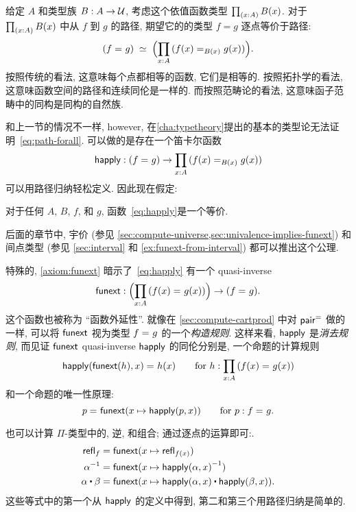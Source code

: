 %
%
%
给定 $A$ 和类型族 $B : A \to \mathcal{U}$, 考虑这个依值函数类型 $\prd{x:A}B(x)$.
对于 $\prd{x:A} B(x)$ 中从 $f$ 到 $g$ 的路径, 期望它的的类型 $f=g$ 逐点等价于路径:
\begin{equation}
  \eqvspaced{(\id{f}{g})}{\Parens{\prd{x:A} (\id[B(x)]{f(x)}{g(x)})}}.\label{eq:path-forall}
\end{equation}
按照传统的看法, 这意味每个点都相等的函数, 它们是相等的.
%
按照拓扑学的看法, 这意味函数空间的路径和连续同伦是一样的.
%
而按照范畴论的看法, 这意味函子范畴中的同构是同构的自然族.

和上一节的情况不一样, however, 在\cref{cha:typetheory}提出的基本的类型论无法证明~\eqref{eq:path-forall}.
可以做的是存在一个笛卡尔函数
\begin{equation}
  \label{eq:happly}
  \happly : (\id{f}{g}) \to \prd{x:A} (\id[B(x)]{f(x)}{g(x)})
\end{equation}
可以用路径归纳轻松定义.
因此现在假定:

\begin{axiom}[函数外延性]
  \label{axiom:funext}
  对于任何 $A$, $B$, $f$, 和 $g$, 函数~\eqref{eq:happly}是一个等价.
\end{axiom}

后面的章节中, 宇价 (参见 \cref{sec:compute-universe,sec:univalence-implies-funext}) 和间点类型 (参见 \cref{sec:interval} 和 \cref{ex:funext-from-interval}) 都可以推出这个公理.

特殊的, \cref{axiom:funext} 暗示了~\eqref{eq:happly} 有一个 quasi-inverse
\[
  \funext : \Parens{\prd{x:A} (\id{f(x)}{g(x)})} \to {(\id{f}{g})}.
\]
这个函数也被称为 ``函数外延性''.
就像在 \cref{sec:compute-cartprod} 中对 $\mathsf{pair}^{\mathord{=}}$ 做的一样, 可以将 $\mathsf{funext}$ 视为类型 $f =_{} g$ 的一个\emph{构造规则}.
这样来看, $\mathsf{happly}$ 是\emph{消去规则}, 而见证 $\mathsf{funext}$ quasi-inverse $\mathsf{happly}$ 的同伦分别是, 一个命题的计算规则
\[
  \id{\happly({\funext{(h)}},x)}{h(x)} \qquad\text{for }h:\prd{x:A} (\id{f(x)}{g(x)})
\]
和一个命题的唯一性原理:
\[
  p =_{} \mathsf{funext} (x \mapsto \mathsf{happly}(p,{x})) \qquad\text{for } p: f =_{} g.
\]

也可以计算 $\Pi$-类型中的, 逆, 和组合; 通过逐点的运算即可:.
\begin{align*}
  \refl{f} &= \funext(x \mapsto \refl{f(x)}) \\
  \opp{\alpha} &= \funext (x \mapsto \opp{\happly (\alpha,x)})  \\
  {\alpha} \ct \beta &= \funext (x \mapsto {\happly({\alpha},x) \ct \happly({\beta},x)}).
\end{align*}
这些等式中的第一个从 $\mathsf{happly}$ 的定义中得到, 第二和第三个用路径归纳是简单的.

